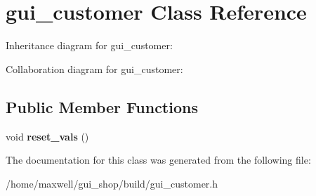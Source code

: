 \hypertarget{classgui__customer}{}\section{gui\+\_\+customer Class Reference}
\label{classgui__customer}


Inheritance diagram for gui\+\_\+customer\+:


Collaboration diagram for gui\+\_\+customer\+:
\subsection*{Public Member Functions}
\begin{DoxyCompactItemize}
\item 
void {\bfseries reset\+\_\+vals} ()\hypertarget{classgui__customer_ad9fc308d991dfdad30969c00467b973e}{}\label{classgui__customer_ad9fc308d991dfdad30969c00467b973e}

\end{DoxyCompactItemize}


The documentation for this class was generated from the following file\+:\begin{DoxyCompactItemize}
\item 
/home/maxwell/gui\+\_\+shop/build/gui\+\_\+customer.\+h\end{DoxyCompactItemize}
